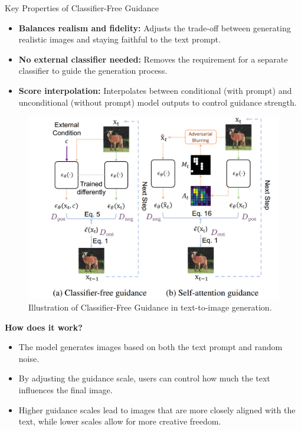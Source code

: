 \begin{frame}[allowframebreaks]{Key Properties of Classifier-Free Guidance}
    \begin{itemize}
        \item \textbf{Balances realism and fidelity:} Adjusts the trade-off between generating realistic images and staying faithful to the text prompt.
        \item \textbf{No external classifier needed:} Removes the requirement for a separate classifier to guide the generation process.
        \item \textbf{Score interpolation:} Interpolates between conditional (with prompt) and unconditional (without prompt) model outputs to control guidance strength.
    \end{itemize}
\framebreak

    \begin{figure}
        \centering
        \includegraphics[width=\linewidth,height=0.8\textheight,keepaspectratio]{images/vision+text/classifier-free-guidance.png}
        \caption*{Illustration of Classifier-Free Guidance in text-to-image generation.}
    \end{figure}

\framebreak

    \textbf{How does it work?}
    \begin{itemize}
        \item The model generates images based on both the text prompt and random noise.
        \item By adjusting the guidance scale, users can control how much the text influences the final image.
        \item Higher guidance scales lead to images that are more closely aligned with the text, while lower scales allow for more creative freedom.
    \end{itemize}
\framebreak


\end{frame}
